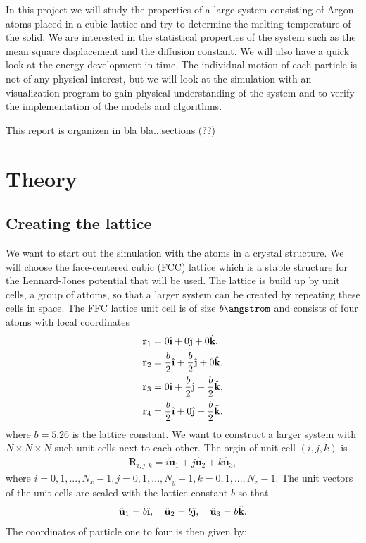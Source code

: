 \documentclass[11pt,a4wide]{article}
\renewcommand{\vec}{\mathbf}
\newcommand{\ihat}{\hat{\textbf{\i}}}
\newcommand{\jhat}{\hat{\textbf{\j}}}
\newcommand{\khat}{\hat{\textbf{k}}}
\begin{document}
In this project we will study the properties of a large system consisting of Argon atoms placed in a cubic lattice and try to determine the melting temperature of the solid. We are interested in the statistical properties of the system such as the mean square displacement and the diffusion constant. We will also have a quick look at the energy development in time. The individual motion of each particle is not of any physical interest, but we will look at the simulation with an visualization program to gain physical understanding of the system and to verify the implementation of the models and algorithms. 

This report is organizen in bla bla...sections (??)



\section{Theory}



\subsection{Creating the lattice} \label{sec: creating_lattice_theory}
We want to start out the simulation with the atoms in a crystal structure. We will choose the face-centered cubic (FCC) lattice which is a stable structure for the Lennard-Jones potential that will be used. The lattice is build up by unit cells, a group of attoms, so that a larger system can be created by repeating these cells in space. The FFC lattice unit cell is of size $b \angstrom $ and consists of four atoms with local coordinates
\begin{align}
	\vec r_1 &= 0 \ihat + 0 \jhat + 0 \khat,\\
	\vec r_2 &= \frac{b}{2} \ihat + \frac{b}{2} \jhat + 0 \khat,\\
	\vec r_3 &= 0 \ihat + \frac{b}{2} \jhat + \frac{b}{2} \khat,\\
	\vec r_4 &= \frac{b}{2} \ihat + 0 \jhat + \frac{b}{2} \khat.
\end{align}
where $b=5.26$ is the lattice constant. We want to construct a larger system with $N\times N\times N$ such unit cells next to each other. The orgin of unit cell $(i,j,k)$ is
\begin{align}
	\vec R_{i,j,k} = i \hat{\textbf{u}}_1 + j \hat{\textbf{u}}_2 + k \hat{\textbf{u}}_3,
\end{align}
where $i=0,1,..., N_x-1, j=0,1,..., N_y-1, k=0,1,..., N_z-1$. The unit vectors of the unit cells are scaled with the lattice constant $b$ so that
\begin{align}
	\hat{\textbf{u}}_1 = b\ihat, \quad \hat{\textbf{u}}_2 = b\jhat, \quad \hat{\textbf{u}}_3 = b\khat.
\end{align}
The coordinates of particle one to four is then given by:
\end{document}
